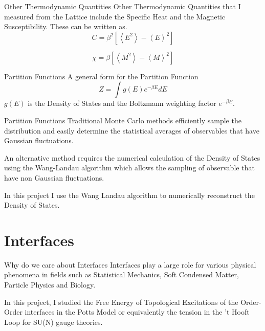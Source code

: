 \documentclass[12pt]{beamer}
\begin{document}
\begin{frame}{Other Thermodynamic Quantities}
Other Thermodynamic Quantities that I measured from the Lattice include the Specific Heat and the Magnetic Susceptibility.
These can be written as.
\begin{equation}
C = \beta^2 \left[ \left\langle E^2 \right\rangle - \left\langle E \right\rangle^2 \right]
\end{equation}

\begin{equation}
\chi = \beta \left[ \left\langle M^2 \right\rangle - \left\langle M \right\rangle^2 \right]
\end{equation}

\end{frame}

\begin{frame}{Partition Functions}
A general form for the Partition Function
\begin{equation}
Z = \int g(E) e^{-\beta E} dE
\end{equation}
$g(E)$ is the Density of States and the Boltzmann weighting factor $e^{-\beta E}$.

\end{frame}

\begin{frame}{Partition Functions}
Traditional Monte Carlo methods efficiently sample the distribution and easily determine the statistical averages of observables that have Gaussian fluctuations.

An alternative method requires the numerical calculation of the Density of States using the Wang-Landau algorithm which allows the sampling of observable that have non Gaussian fluctuations.


In this project I use the Wang Landau algorithm to numerically reconstruct the Density of States.
\end{frame}

\section{Interfaces}
\begin{frame}{Why do we care about Interfaces}
Interfaces play a large role for various physical phenomena in fields such as Statistical Mechanics, Soft Condensed Matter, Particle Physics and Biology.

In this project, I studied the Free Energy of Topological Excitations of the  Order-Order interfaces in the Potts Model or equivalently the tension in the 't Hooft Loop for SU(N) gauge theories.

\end{frame}
\end{document}
